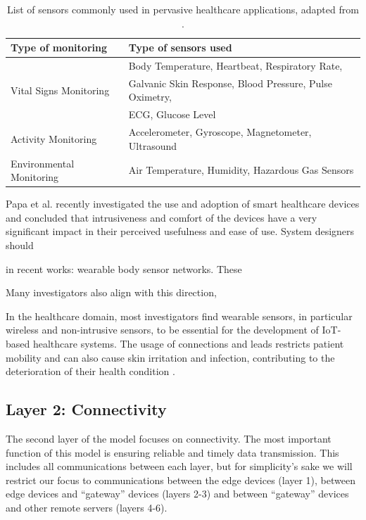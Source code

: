 \begin{table}[H]
    \centering
    \begin{tabular}{l|l}
        \textbf{Type of monitoring} & \textbf{Type of sensors used} \\ 
        \hline
        \multirow{3}{*}{Vital Signs Monitoring} & Body Temperature, Heartbeat, Respiratory Rate, \\ & Galvanic Skin Response, Blood Pressure, Pulse Oximetry, \\ & \acf{ECG}, Glucose Level \\ \hline
        \multirow{1}{*}{Activity Monitoring} & Accelerometer, Gyroscope, Magnetometer, Ultrasound \\
        \hline
        \multirow{1}{*}{Environmental Monitoring} & Air Temperature, Humidity, Hazardous Gas Sensors
    \end{tabular}
    \caption[List of sensors commonly used in pervasive healthcare applications]{List of sensors commonly used in pervasive healthcare applications, adapted from \cite{MinhDang2019}.}
    \label{tab:layer1-sensors}
\end{table}

Papa et al. \cite{Papa2020} recently investigated the use and adoption of smart healthcare devices and concluded that intrusiveness and comfort of the devices have a very significant impact in their perceived usefulness and ease of use. System designers should 

in recent works: wearable body sensor networks. These  

Many investigators also align with this direction, 

In the healthcare domain, most investigators find wearable sensors, in particular wireless and non-intrusive sensors, to be essential for the development of IoT-based healthcare systems. The usage of connections and leads restricts patient mobility and can also cause skin irritation and infection, contributing to the deterioration of their health condition \cite{Darwish2011}. 


\subsection{Layer 2: Connectivity}
\label{sec:iot-model-layer2}

The second layer of the model focuses on connectivity. The most important function of this model is ensuring reliable and timely data transmission. This includes all communications between each layer, but for simplicity's sake we will restrict our focus to communications between the edge devices (layer 1), between edge devices and ``gateway'' devices (layers 2-3) and between ``gateway'' devices and other remote servers (layers 4-6).

